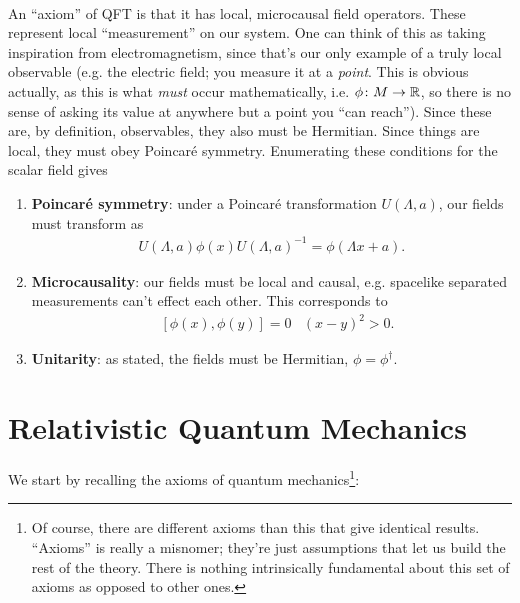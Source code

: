 \documentclass[11pt]{article}
\begin{document}
\\
An ``axiom'' of QFT is that it has local, microcausal field operators. These
represent local ``measurement'' on our system. One can think of this as taking
inspiration from electromagnetism, since that's our only example of a truly
local observable (e.g. the electric field; you measure it at a \emph{point}.
This is obvious actually, as this is what \emph{must} occur mathematically,
i.e. $\phi \colon M \to \mathbb{R}$, so there is no sense of asking its value at
anywhere but a point you ``can reach''). Since these are, by definition, observables,
they also must be Hermitian. Since things are local, they must obey Poincaré
symmetry. Enumerating these conditions for the scalar field gives
\begin{enumerate}
    \item \textbf{Poincaré symmetry}: under a Poincaré transformation $U(\Lambda, a)$,
    our fields must transform as
    \begin{align*}
        U(\Lambda, a) \phi(x) U(\Lambda, a)^{-1} = \phi(\Lambda x + a).
    \end{align*}
    \item \textbf{Microcausality}: our fields must be local and causal, e.g. spacelike
    separated measurements can't effect each other. This corresponds to
    \begin{align*}
        & [\phi(x), \phi(y)] = 0 
        & (x - y)^2 > 0.
    \end{align*}
    \item \textbf{Unitarity}: as stated, the fields must be Hermitian,
    $\phi = \phi^\dagger$.
\end{enumerate}


\section{Relativistic Quantum Mechanics}

We start by recalling the axioms of quantum mechanics\footnote{
    Of course, there are different axioms than this that give
    identical results. ``Axioms'' is really a misnomer; they're
    just assumptions that let us build the rest of the theory.
    There is nothing intrinsically fundamental about this set of
    axioms as opposed to other ones.
}:
\end{document}
